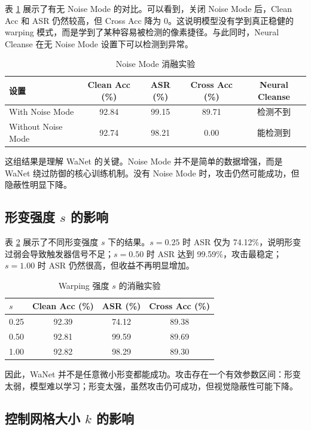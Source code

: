 \documentclass[UTF8,zihao=-4]{ctexart}
\begin{document}
表 \ref{tab:noise} 展示了有无 Noise Mode 的对比。可以看到，关闭 Noise Mode 后，Clean Acc 和 ASR 仍然较高，但 Cross Acc 降为 0。这说明模型没有学到真正稳健的 warping 模式，而是学到了某种容易被检测的像素捷径。与此同时，Neural Cleanse 在无 Noise Mode 设置下可以检测到异常。

\begin{table}[H]
\centering
\caption{Noise Mode 消融实验}
\label{tab:noise}
\begin{tabular}{lcccc}
\toprule
设置 & Clean Acc (\%) & ASR (\%) & Cross Acc (\%) & Neural Cleanse \\
\midrule
With Noise Mode & 92.84 & 99.15 & 89.71 & 检测不到 \\
Without Noise Mode & 92.74 & 98.21 & 0.00 & 能检测到 \\
\bottomrule
\end{tabular}
\end{table}

这组结果是理解 WaNet 的关键。Noise Mode 并不是简单的数据增强，而是 WaNet 绕过防御的核心训练机制。没有 Noise Mode 时，攻击仍然可能成功，但隐蔽性明显下降。

\subsection{形变强度 \texorpdfstring{$s$}{s} 的影响}

表 \ref{tab:s} 展示了不同形变强度 $s$ 下的结果。$s=0.25$ 时 ASR 仅为 74.12\%，说明形变过弱会导致触发器信号不足；$s=0.50$ 时 ASR 达到 99.59\%，攻击最稳定；$s=1.00$ 时 ASR 仍然很高，但收益不再明显增加。

\begin{table}[H]
\centering
\caption{Warping 强度 $s$ 的消融实验}
\label{tab:s}
\begin{tabular}{lccc}
\toprule
$s$ & Clean Acc (\%) & ASR (\%) & Cross Acc (\%) \\
\midrule
0.25 & 92.39 & 74.12 & 89.38 \\
0.50 & 92.81 & 99.59 & 89.69 \\
1.00 & 92.82 & 98.29 & 89.30 \\
\bottomrule
\end{tabular}
\end{table}

因此，WaNet 并不是任意微小形变都能成功。攻击存在一个有效参数区间：形变太弱，模型难以学习；形变太强，虽然攻击仍可成功，但视觉隐蔽性可能下降。

\subsection{控制网格大小 \texorpdfstring{$k$}{k} 的影响}
\end{document}
